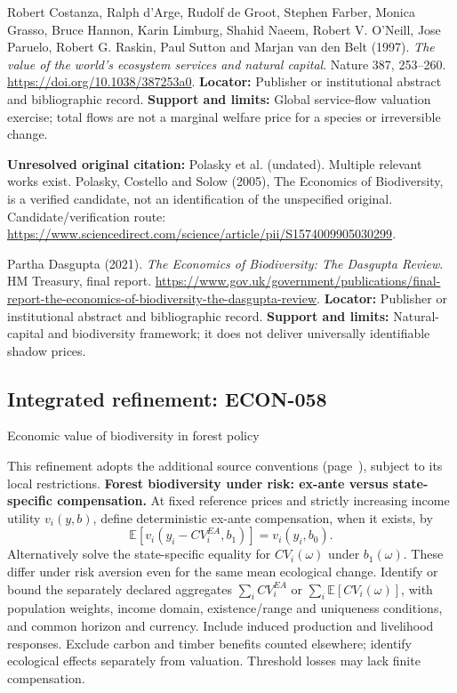 \documentclass[11pt,a4paper]{article}
\begin{document}
\begin{enumerate}[label={[\textnormal{S}\arabic*]},leftmargin=*]

\item Robert Costanza, Ralph d’Arge, Rudolf de Groot, Stephen Farber, Monica Grasso, Bruce Hannon, Karin Limburg, Shahid Naeem, Robert V. O’Neill, Jose Paruelo, Robert G. Raskin, Paul Sutton and Marjan van den Belt (1997). \emph{The value of the world’s ecosystem services and natural capital}. Nature 387, 253–260. \url{https://doi.org/10.1038/387253a0}. \textbf{Locator:} Publisher or institutional abstract and bibliographic record. \textbf{Support and limits:} Global service-flow valuation exercise; total flows are not a marginal welfare price for a species or irreversible change.

\item \textbf{Unresolved original citation:} Polasky et al. (undated). Multiple relevant works exist. Polasky, Costello and Solow (2005), The Economics of Biodiversity, is a verified candidate, not an identification of the unspecified original. Candidate/verification route: \url{https://www.sciencedirect.com/science/article/pii/S1574009905030299}.

\item Partha Dasgupta (2021). \emph{The Economics of Biodiversity: The Dasgupta Review}. HM Treasury, final report. \url{https://www.gov.uk/government/publications/final-report-the-economics-of-biodiversity-the-dasgupta-review}. \textbf{Locator:} Publisher or institutional abstract and bibliographic record. \textbf{Support and limits:} Natural-capital and biodiversity framework; it does not deliver universally identifiable shadow prices.

\end{enumerate}

\subsection*{Integrated refinement: ECON-058}
{\sffamily\small\color{muted}Economic value of biodiversity in forest policy\par}
This refinement adopts the additional source conventions
(page~\pageref{audited:conventions}), subject to its local restrictions.
\textbf{Forest biodiversity under risk: ex-ante versus state-specific compensation.}
At fixed reference prices and strictly increasing income utility $v_i(y,b)$,
define deterministic ex-ante compensation, when it exists, by
\[
\mathbb E[v_i(y_i-CV_i^{EA},b_1)]=v_i(y_i,b_0).
\]
Alternatively solve the state-specific equality for $CV_i(\omega)$ under
$b_1(\omega)$. These differ under risk aversion even for the same mean ecological
change. Identify or bound the separately declared aggregates
$\sum_iCV_i^{EA}$ or $\sum_i\mathbb E[CV_i(\omega)]$, with population weights,
income domain, existence/range and uniqueness conditions, and common horizon and
currency. Include induced production and livelihood responses. Exclude carbon
and timber benefits counted elsewhere; identify ecological effects separately
from valuation. Threshold losses may lack finite compensation.
\end{document}

